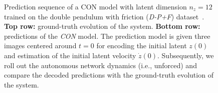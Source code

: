 \begin{figure}[hb]
    \caption{Prediction sequence of a \gls{CON} model with latent dimension $n_z=12$ trained on the double pendulum with friction (\emph{D-P+F}) dataset~\cite{botev2021priors}. 
    \textbf{Top row:} ground-truth evolution of the system. \textbf{Bottom row:} predictions of the \emph{CON} model. \newline
    The prediction model is given three images centered around $t=0$ for encoding the initial latent $z(0)$ and estimation of the initial latent velocity $\dot{z}(0)$. Subsequently, we roll out the autonomous network dynamics (i.e., unforced) and compare the decoded predictions with the ground-truth evolution of the system.  
    }\label{fig:con:latent_dynamics:sequence_of_stills:d-p+f:rollout7}
\end{figure}

